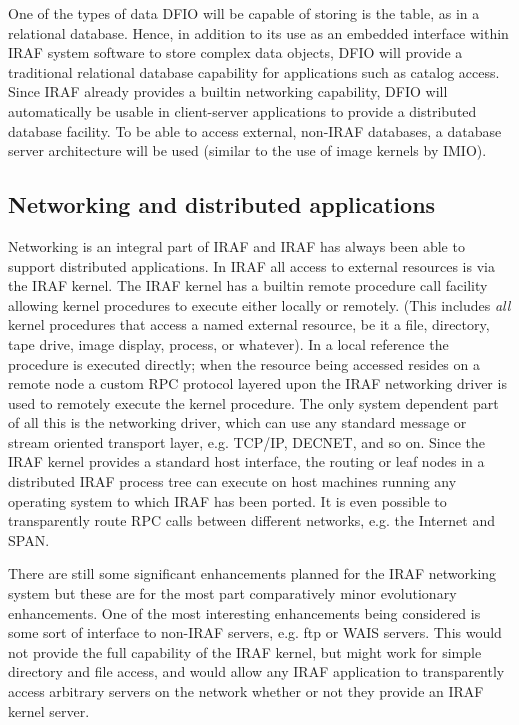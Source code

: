 One of the types of data DFIO will be capable of storing is the table, as in
a relational database.  Hence, in addition to its use as an embedded
interface within IRAF system software to store complex data objects, DFIO
will provide a traditional relational database capability for applications
such as catalog access.  Since IRAF already provides a builtin networking
capability, DFIO will automatically be usable in client-server applications
to provide a distributed database facility.  To be able to access external,
non-IRAF databases, a database server architecture will be used (similar to
the use of image kernels by IMIO).

\subsection {Networking and distributed applications}

Networking is an integral part of IRAF and IRAF has always been able to
support distributed applications.  In IRAF all access to external resources
is via the IRAF kernel.  The IRAF kernel has a builtin remote procedure call
facility allowing kernel procedures to execute either locally or remotely.
(This includes {\it all} kernel procedures that access a named external
resource, be it a file, directory, tape drive, image display, process, or
whatever).  In a local reference the procedure is executed directly; when
the resource being accessed resides on a remote node a custom RPC protocol
layered upon the IRAF networking driver is used to remotely execute the
kernel procedure.  The only system dependent part of all this is the
networking driver, which can use any standard message or stream oriented
transport layer, e.g.  TCP/IP, DECNET, and so on.  Since the IRAF kernel
provides a standard host interface, the routing or leaf nodes in a
distributed IRAF process tree can execute on host machines running any
operating system to which IRAF has been ported.  It is even possible to
transparently route RPC calls between different networks, e.g. the Internet
and SPAN.

There are still some significant enhancements planned for the IRAF
networking system but these are for the most part comparatively minor
evolutionary enhancements.  One of the most interesting enhancements being
considered is some sort of interface to non-IRAF servers, e.g. ftp or WAIS
servers.  This would not provide the full capability of the IRAF kernel, but
might work for simple directory and file access, and would allow any IRAF
application to transparently access arbitrary servers on the network whether
or not they provide an IRAF kernel server.


